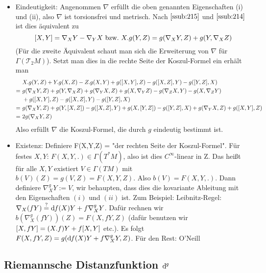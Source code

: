 \begin{itemize}
\item Eindeutigkeit: Angenommen $\nabla$ erfüllt die oben genannten Eigenschaften (i) und (ii), also $\nabla$ ist torsionsfrei und metrisch. Nach $\ref{ssub:215}$ und $\ref{ssub:214}$ ist dies äquivalent zu
\[
\benbrace{X,Y} = \nabla_X Y - \nabla_Y X\ \text{bzw.}\ X.g(Y,Z) = g(\nabla_X Y,Z) + g(Y,\nabla_X Z)
\]
(Für die zweite Äquivalent schaut man sich die Erweiterung von $\nabla$ für $\Gamma(\mathcal{T}_2 M)$). Setzt man dies in die rechte Seite der Koszul-Formel ein erhält man
\begin{align*}
& X.g(Y,Z) + Y.g(X,Z) - Z.g(X,Y) + g([X,Y],Z) - g([X,Z],Y) - g([Y,Z],X)\\
=\ & g(\nabla_X Y,Z) + g(Y,\nabla_X Z) + g(\nabla_Y X,Z) + g(X,\nabla_Y Z) - g(\nabla_Z X,Y) - g(X,\nabla_Z Y)\\
& + g([X,Y],Z) - g([X,Z],Y) - g([Y,Z],X)\\
=\ & g(\nabla_X Y,Z) + g(Y,[X,Z]) - g([X,Z],Y) + g(X,[Y,Z]) - g([Y,Z],X) + g(\nabla_Y X,Z) + g([X,Y],Z)\\
=\ & 2g(\nabla_X Y,Z)
\end{align*}
Also erfüllt $\nabla$ die Koszul-Formel, die durch $g$ eindeutig bestimmt ist.
\item Existenz: Definiere F(X,Y,Z) = "der rechten Seite der Koszul-Formel". Für festes $X,Y$: $F(X,Y,.) \in \Gamma(T^* M)$, also ist dies $C^\infty$-linear in Z. 
Das heißt für alle $X,Y$ existiert $V \in \Gamma(TM)$ mit $b(V)(Z) = g(V,Z) = F(X,Y,Z)$. Also $b(V) = F(X,Y,.)$. Dann definiere $\nabla_X^g Y := V$, wir behaupten, dass dies die kovariante Ableitung mit den Eigenschaften $(i)$ und $(ii)$ ist. Zum Beispiel: Leibnitz-Regel: $\nabla_X (fY) \overset{?}{=} \mathrm{d}\mkern-1.0mu f(X)Y + f\nabla_X^g Y$. Dafür rechnen wir $b(\nabla_X^g(fY))(Z) = F(X,fY,Z)$ (dafür benutzen wir $[X,fY] = (X.f)Y + f[X,Y]$ etc.). Es folgt $F(X,fY,Z) = g(\mathrm{d}\mkern-1.0mu f(X)Y + f\nabla_X^g Y,Z)$. Für den Rest: O'Neill
\end{itemize}


\subsection{Riemannsche Distanzfunktion $\mathrm{d}\mkern-1.0mu^g$}
\label{sub:23}


